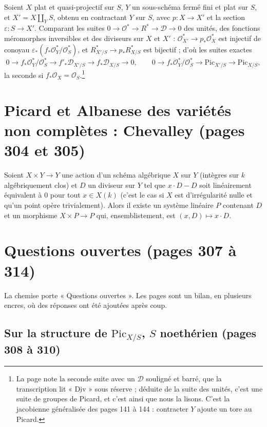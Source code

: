 \documentclass[11pt,a4paper]{article}
\begin{document}
Soient $X$ plat et quasi-projectif sur $S$, $Y$ un sous-schéma fermé fini et
plat sur $S$, et $X' = X \amalg_Y S$, obtenu en contractant $Y$ sur $S$, avec
$p \colon X \to X'$ et la section $\varepsilon \colon S \to X'$. Comparant les
suites $0 \to \mathcal{O}^* \to R^* \to \mathcal{D} \to 0$ des unités, des
fonctions méromorphes inversibles et des diviseurs sur $X$ et $X'$ :
$\mathcal{O}^*_{X'} \to p_*\mathcal{O}^*_X$ est injectif de conoyau
$\varepsilon_*(f_*\mathcal{O}^*_Y/\mathcal{O}^*_S)$, et
$R^*_{X'/S} \to p_*R^*_{X/S}$ est bijectif ; d'où les suites exactes
\[
0 \to f_*\mathcal{O}^*_Y/\mathcal{O}^*_S \to f'_*\mathcal{D}_{X'/S} \to f_*\mathcal{D}_{X/S} \to 0 ,
\qquad
0 \to f_*\mathcal{O}^*_Y/\mathcal{O}^*_S \to \mathrm{Pic}_{X'/S} \to \mathrm{Pic}_{X/S} ,
\]
la seconde si $f_*\mathcal{O}_X = \mathcal{O}_S$.\footnote{La page note la
seconde suite avec un $\mathcal{D}$ souligné et barré, que la transcription lit
« $\underline{\mathrm{Div}}$ » sous réserve ; déduite de la suite des unités,
c'est une suite de groupes de Picard, et c'est ainsi que nous la lisons. C'est
la jacobienne généralisée des pages 141 à 144 : contracter $Y$ ajoute un tore
au Picard.}

\section*{Picard et Albanese des variétés non complètes : Chevalley (pages 304 et 305)}

Soient $X \times Y \to Y$ une action d'un schéma algébrique $X$ sur $Y$
(intègres sur $k$ algébriquement clos) et $D$ un diviseur sur $Y$ tel que
$x \cdot D - D$ soit linéairement équivalent à $0$ pour tout $x \in X(k)$
(c'est le cas si $X$ est d'irrégularité nulle et qu'un point opère
trivialement). Alors il existe un système linéaire $P$ contenant $D$ et un
morphisme $X \times P \to P$ qui, ensemblistement, est $(x, D) \mapsto x \cdot D$.

\section*{Questions ouvertes (pages 307 à 314)}

La chemise porte « Questions ouvertes ». Les pages sont un bilan, en
plusieurs encres, où des réponses ont été ajoutées après coup.

\subsection*{Sur la structure de $\mathrm{Pic}_{X/S}$, $S$ noethérien (pages 308 à 310)}
\end{document}
